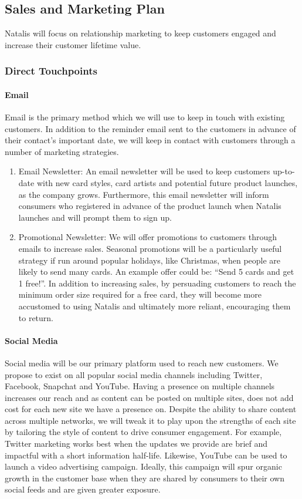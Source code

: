 \documentclass[10pt,a4paper]{article}
\begin{document}
\subsection*{Sales and Marketing Plan}
Natalis will focus on relationship marketing to keep customers engaged and increase their customer lifetime value.

\subsubsection*{Direct Touchpoints}
\paragraph*{Email}
Email is the primary method which we will use to keep in touch with existing customers. In addition to the reminder email sent to the customers in advance of their contact's important date, we will keep in contact with customers through a number of marketing strategies.
\begin{enumerate}
	\item Email Newsletter: An email newsletter will be used to keep customers up-to-date with new card styles, card artists and potential future product launches, as the company grows. Furthermore, this email newsletter will inform consumers who registered in advance of the product launch when Natalis launches and will prompt them to sign up.
	\item Promotional Newsletter: We will offer promotions to customers through emails to increase sales. Seasonal promotions will be a particularly useful strategy if run around popular holidays, like Christmas, when people are likely to send many cards. An example offer could be: ``Send 5 cards and get 1 free!''. In addition to increasing sales, by persuading customers to reach the minimum order size required for a free card, they will become more accustomed to using Natalis and ultimately more reliant, encouraging them to return.
\end{enumerate}

\paragraph*{Social Media}
Social media will be our primary platform used to reach new customers. We propose to exist on all popular social media channels including Twitter, Facebook, Snapchat and YouTube. Having a presence on multiple channels increases our reach and as content can be posted on multiple sites, does not add cost for each new site we have a presence on. Despite the ability to share content across multiple networks, we will tweak it to play upon the strengths of each site by tailoring the style of content to drive consumer engagement. For example, Twitter marketing works best when the updates we provide are brief and impactful with a short information half-life. Likewise, YouTube can be used to launch a video advertising campaign. Ideally, this campaign will spur organic growth in the customer base when they are shared by consumers to their own social feeds and are given greater exposure.
\end{document}
